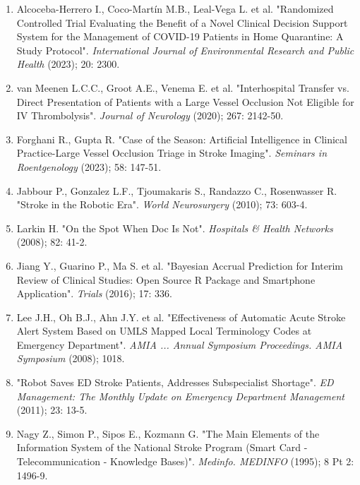{{\begin{enumerate}
    \item Alcoceba-Herrero I., Coco-Martín M.B., Leal-Vega L. et al. "Randomized Controlled Trial Evaluating the Benefit of a Novel Clinical Decision Support System for the Management of COVID-19 Patients in Home Quarantine: A Study Protocol". \textit{International Journal of Environmental Research and Public Health} (2023); 20: 2300.
    \item van Meenen L.C.C., Groot A.E., Venema E. et al. "Interhospital Transfer vs. Direct Presentation of Patients with a Large Vessel Occlusion Not Eligible for IV Thrombolysis". \textit{Journal of Neurology} (2020); 267: 2142-50.
    \item Forghani R., Gupta R. "Case of the Season: Artificial Intelligence in Clinical Practice-Large Vessel Occlusion Triage in Stroke Imaging". \textit{Seminars in Roentgenology} (2023); 58: 147-51.
    \item Jabbour P., Gonzalez L.F., Tjoumakaris S., Randazzo C., Rosenwasser R. "Stroke in the Robotic Era". \textit{World Neurosurgery} (2010); 73: 603-4.
    \item Larkin H. "On the Spot When Doc Is Not". \textit{Hospitals \& Health Networks} (2008); 82: 41-2.
    \item Jiang Y., Guarino P., Ma S. et al. "Bayesian Accrual Prediction for Interim Review of Clinical Studies: Open Source R Package and Smartphone Application". \textit{Trials} (2016); 17: 336.
    \item Lee J.H., Oh B.J., Ahn J.Y. et al. "Effectiveness of Automatic Acute Stroke Alert System Based on UMLS Mapped Local Terminology Codes at Emergency Department". \textit{AMIA ... Annual Symposium Proceedings. AMIA Symposium} (2008); 1018.
    \item "Robot Saves ED Stroke Patients, Addresses Subspecialist Shortage". \textit{ED Management: The Monthly Update on Emergency Department Management} (2011); 23: 13-5.
    \item Nagy Z., Simon P., Sipos E., Kozmann G. "The Main Elements of the Information System of the National Stroke Program (Smart Card - Telecommunication - Knowledge Bases)". \textit{Medinfo. MEDINFO} (1995); 8 Pt 2: 1496-9.
\end{enumerate}
}
}